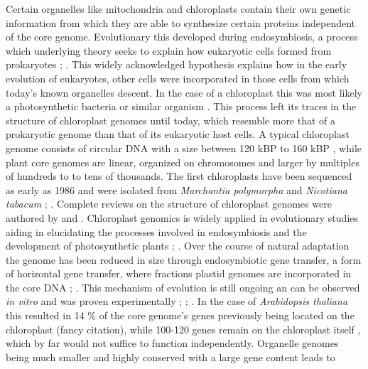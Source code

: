 Certain organelles like mitochondria and chloroplasts contain their own genetic information from which they
are able to synthesize certain proteins independent of the core genome. Evolutionary this developed during
endosymbiosis, a process which underlying theory seeks to explain how eukaryotic cells formed from prokaryotes
\cite{mereschkowsky1905uber}; \cite{kutschera2005endosymbiosis}. This widely acknowledged hypothesis explains
how in the early evolution of eukaryotes, other cells were incorporated in those cells from which today's
known organelles descent. In the case of a chloroplast this was most likely a photosynthetic bacteria or
similar organism \cite{archibald2015endosymbiosis}. This process left its traces in the structure of
chloroplast genomes until today, which resemble more that of a prokaryotic genome than that of its eukaryotic
host cells. A typical chloroplast genome consists of circular DNA with a size between 120 kBP to 160 kBP
\cite{palmer_1985}, while plant core genomes are linear, organized on chromosomes and larger by multiples of
hundreds to to tens of thousands. \newline The first chloroplasts have been sequenced as early as 1986 and
were isolated from \textit{Marchantia polymorpha} and \textit{Nicotiana tabacum}
\cite{ohyama_chloroplast_1986}; \cite{shinozaki_complete_1986}. Complete reviews on the structure of
chloroplast genomes were authored by \cite{green_chloroplast_2011} and
\cite{wicke_evolution_2011}. Chloroplast genomics is widely applied in evolutionary studies aiding in
elucidating the processes involved in endosymbiosis and the development of photosynthetic plants
\cite{martin_evolutionary_2002}; \cite{xiao-ming_inferring_2017}.  Over the course of natural adaptation the
genome has been reduced in size through endosymbiotic gene transfer, a form of horizontal gene transfer, where
fractions plastid genomes are incorporated in the core DNA \cite{martin_evolutionary_2002};
\cite{deiner_environmental_2017} . This mechanism of evolution is still ongoing an can be observed \textit{in
  vitro} and was proven experimentally \cite{bock2017witnessing}; \cite{fuentes2014horizontal};
\cite{stegemann2009exchange}. \newline In the case of \textit{Arabidopsis thaliana} this resulted in 14 \% of
the core genome's genes previously being located on the chloroplast (fancy citation), while 100-120 genes
remain on the chloroplast itself \cite{wicke_evolution_2011}, which by far would not suffice to function
independently. Organelle genomes being much smaller and highly conserved with a large gene content leads to
